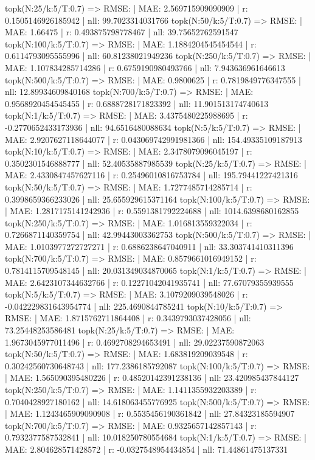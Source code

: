 topk(N:25/k:5/T:0.7) => RMSE: | MAE: 2.569715909090909 | r: 0.1505146926185942 | nll: 99.7023314031766
topk(N:50/k:5/T:0.7) => RMSE: | MAE: 1.66475 | r: 0.493875798778467 | nll: 39.75652762591547
topk(N:100/k:5/T:0.7) => RMSE: | MAE: 1.1884204545454544 | r: 0.6114793095555996 | nll: 60.81238021949236
topk(N:250/k:5/T:0.7) => RMSE: | MAE: 1.107834285714286 | r: 0.6759190980493766 | nll: 7.943636961646613
topk(N:500/k:5/T:0.7) => RMSE: | MAE: 0.9800625 | r: 0.7819849776347555 | nll: 12.89934609840168
topk(N:700/k:5/T:0.7) => RMSE: | MAE: 0.9568920454545455 | r: 0.6888728171823392 | nll: 11.901513174740613
topk(N:1/k:5/T:0.7) => RMSE: | MAE: 3.4375480225988695 | r: -0.2770652433173936 | nll: 94.6516480088634
topk(N:5/k:5/T:0.7) => RMSE: | MAE: 2.9207627118644077 | r: 0.043069742991981366 | nll: 154.49335109187913
topk(N:10/k:5/T:0.7) => RMSE: | MAE: 2.3478079096045197 | r: 0.3502301546888777 | nll: 52.40535887985539
topk(N:25/k:5/T:0.7) => RMSE: | MAE: 2.4330847457627116 | r: 0.25496010816753784 | nll: 195.79441227421316
topk(N:50/k:5/T:0.7) => RMSE: | MAE: 1.7277485714285714 | r: 0.3998659366233026 | nll: 25.655929615371164
topk(N:100/k:5/T:0.7) => RMSE: | MAE: 1.2817175141242936 | r: 0.5591381792224688 | nll: 1014.6398680162855
topk(N:250/k:5/T:0.7) => RMSE: | MAE: 1.016813559322034 | r: 0.7266871140359754 | nll: 42.99443003362753
topk(N:500/k:5/T:0.7) => RMSE: | MAE: 1.0103977272727271 | r: 0.6886238647040911 | nll: 33.303741410311396
topk(N:700/k:5/T:0.7) => RMSE: | MAE: 0.8579661016949152 | r: 0.7814115709548145 | nll: 20.031349034870065
topk(N:1/k:5/T:0.7) => RMSE: | MAE: 2.6423107344632766 | r: 0.12271042041935741 | nll: 77.67079355939555
topk(N:5/k:5/T:0.7) => RMSE: | MAE: 3.1079209039548026 | r: -0.042229831643954774 | nll: 225.4690844785241
topk(N:10/k:5/T:0.7) => RMSE: | MAE: 1.8715762711864408 | r: 0.3439793037428056 | nll: 73.25448253586481
topk(N:25/k:5/T:0.7) => RMSE: | MAE: 1.9673045977011496 | r: 0.4692708294653491 | nll: 29.02237590872063
topk(N:50/k:5/T:0.7) => RMSE: | MAE: 1.683819209039548 | r: 0.30242560730648743 | nll: 177.2386185792087
topk(N:100/k:5/T:0.7) => RMSE: | MAE: 1.565090395480226 | r: 0.48520142391238136 | nll: 23.420985437844127
topk(N:250/k:5/T:0.7) => RMSE: | MAE: 1.1411355932203389 | r: 0.7040428927180162 | nll: 14.618063455776925
topk(N:500/k:5/T:0.7) => RMSE: | MAE: 1.1243465909090908 | r: 0.5535456190361842 | nll: 27.84323185594907
topk(N:700/k:5/T:0.7) => RMSE: | MAE: 0.9325657142857143 | r: 0.7932377587532841 | nll: 10.018250780554684
topk(N:1/k:5/T:0.7) => RMSE: | MAE: 2.804628571428572 | r: -0.0327548954434854 | nll: 71.44861475137331
